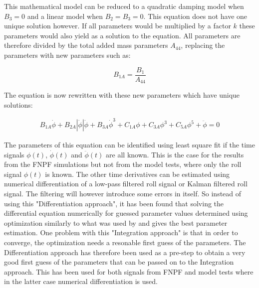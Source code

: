     

    This mathematical model can be reduced to a quadratic damping model when
$B_3=0$ and a linear model when $B_2=B_3=0$. This equation does not
have one unique solution however. If all parameters would be multiplied
by a factor $k$ these parameters would also yield as a solution to the
equation. All parameters are therefore divided by the total added mass
parameters $A_{44}$, replacing the parameters with new parameters such
as:
 
            
    
    \begin{equation}
B_{1A} = \frac{B_{1}}{A_{44}}
\label{eq:equation}
\end{equation}

    

    The equation is now rewritten with these new parameters which have
unique solutions:
 
            
    
    \begin{equation}
\begin{aligned}
B_{1A} \dot{\phi} + B_{2A} \left|{\dot{\phi}}\right| \dot{\phi} + B_{3A} \dot{\phi}^{3} + C_{1A} \phi + C_{3A} \phi^{3} + C_{5A} \phi^{5} + \ddot{\phi} = 0
\end{aligned}
\label{eq:equation}
\end{equation}

    

    The parameters of this equation can be identified using least square fit
if the time signals $\phi(t)$, $\dot{\phi}(t)$ and
$\ddot{\phi}(t)$ are all known. This is the case for the results from
the FNPF simulations but not from the model tests, where only the roll
signal $\phi(t)$ is known. The other time derivatives can be estimated
using numerical differentiation of a low-pass filtered roll signal or
Kalman filtered roll signal. The filtering will however introduce some
errors in itself. So instead of using this "Differentiation approach",
it has been found that solving the differential equation numerically for
guessed parameter values determined using optimization similarly to what
was used by \cite{7505983/FJHQJJUH} and \cite{7505983/9B7QMVJJ} gives
the best parameter estimation. One problem with this "Integration
approach" is that in order to converge, the optimization needs a
resonable first guess of the parameters. The Differentiation approach
has therefore been used as a pre-step to obtain a very good first guess
of the parameters that can be passed on to the Integration approach.
This has been used for both signals from FNPF and model tests where in
the latter case numerical differentiation is used.

